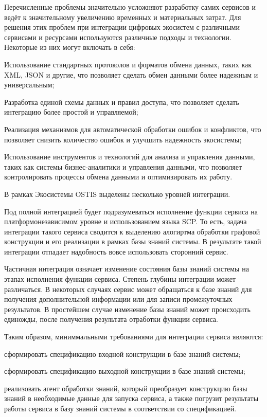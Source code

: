 Перечисленные проблемы значительно усложняют разработку самих сервисов и ведёт к значительному увеличению временных и материальных затрат. Для решения этих проблем при интеграции цифровых экосистем с различными сервисами и ресурсами используются различные подходы и технологии. Некоторые из них могут включать в себя:

\begin{textitemize}
\item Использование стандартных протоколов и форматов обмена данных, таких как XML, JSON и другие, что позволяет сделать обмен данными более надежным и универсальным;
\item Разработка единой схемы данных и правил доступа, что позволяет сделать интеграцию более простой и управляемой;
\item Реализация механизмов для автоматической обработки ошибок и конфликтов, что позволяет снизить количество ошибок и улучшить надежность экосистемы;
\item Использование инструментов и технологий для анализа и управления данными, таких как системы бизнес-аналитики и управления данными, что позволяет контролировать процессы обмена данными и оптимизировать их работу.
\end{textitemize}


В рамках Экосистемы OSTIS выделены несколько уровней интеграции. 

Под полной интеграцией будет подразумеваться исполнение функции сервиса на платформонезависимом уровне и использованием языка SCP. То есть, задача интеграции такого сервиса сводится к выделению алогиртма обработки графовой конструкции и его реализации в рамках базы знаний системы. В результате такой интеграции отпадает надобность вовсе использовать сторонний сервис. 

Частичная интеграция означает изменение состояния базы знаний системы на этапах исполнения функции сервиса. Степень глубины интеграции может различаться. В некоторых случаях сервис может обращаться к базе знаний для получения дополнительной информации или для записи промежуточных результатов. В простейшем случае изменение базы знаний может происходить единожды, после получения результата отработки функции сервиса. 

Таким образом, миниммальными требованиями для интеграции сервиса являются:
\begin{textitemize}
    \item сформировать спецификацию входной конструкции в базе знаний системы;
    \item сформировать спецификацию выходной конструкции в базе знаний системы;
    \item реализовать агент обработки знаний, который преобразует конструкцию базы знаний в необходимые данные для запуска сервиса, а также погрузит результаты работы сервиса в базу знаний системы в соответствии со спецификацией.
\end{textitemize}

